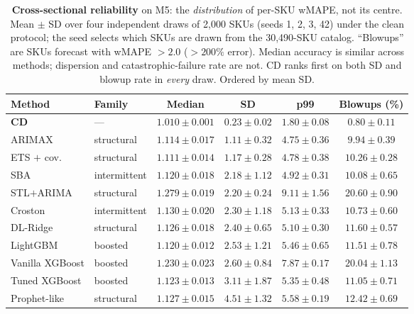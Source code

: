 \documentclass[10pt]{article} %
\theoremstyle{plain}
\theoremstyle{definition}
\begin{document}
\begin{table}[t]
\centering
\footnotesize
\setlength{\tabcolsep}{4pt}
\caption{\textbf{Cross-sectional reliability} on M5: the \emph{distribution} of per-SKU wMAPE, not its centre. Mean $\pm$ SD over four independent draws of 2{,}000 SKUs (seeds 1, 2, 3, 42) under the clean protocol; the seed selects which SKUs are drawn from the 30{,}490-SKU catalog. ``Blowups'' are SKUs forecast with wMAPE $>2.0$ ($>200\%$ error). Median accuracy is similar across methods; dispersion and catastrophic-failure rate are not. CD ranks first on both SD and blowup rate in \emph{every} draw. Ordered by mean SD.}
\label{tab:reliability}
\begin{tabular}{@{}llcccc@{}}
\toprule
Method & Family & Median & SD & p99 & Blowups (\%) \\
\midrule
\textbf{CD} & --- & $\mathbf{1.010 \pm 0.001}$ & $\mathbf{0.23 \pm 0.02}$ & $\mathbf{1.80 \pm 0.08}$ & $\mathbf{0.80 \pm 0.11}$ \\
\cmidrule(lr){1-6}
ARIMAX & structural & $1.114 \pm 0.017$ & $1.11 \pm 0.32$ & $4.75 \pm 0.36$ & $9.94 \pm 0.39$ \\
ETS $+$ cov. & structural & $1.111 \pm 0.014$ & $1.17 \pm 0.28$ & $4.78 \pm 0.38$ & $10.26 \pm 0.28$ \\
SBA & intermittent & $1.120 \pm 0.018$ & $2.18 \pm 1.12$ & $4.92 \pm 0.31$ & $10.08 \pm 0.65$ \\
STL$+$ARIMA & structural & $1.279 \pm 0.019$ & $2.20 \pm 0.24$ & $9.11 \pm 1.56$ & $20.60 \pm 0.90$ \\
Croston & intermittent & $1.130 \pm 0.020$ & $2.30 \pm 1.18$ & $5.13 \pm 0.33$ & $10.73 \pm 0.60$ \\
DL-Ridge & structural & $1.126 \pm 0.018$ & $2.40 \pm 0.65$ & $5.10 \pm 0.30$ & $11.60 \pm 0.57$ \\
LightGBM & boosted & $1.120 \pm 0.012$ & $2.53 \pm 1.21$ & $5.46 \pm 0.65$ & $11.51 \pm 0.78$ \\
Vanilla XGBoost & boosted & $1.230 \pm 0.023$ & $2.60 \pm 0.84$ & $7.87 \pm 0.17$ & $20.04 \pm 1.13$ \\
Tuned XGBoost & boosted & $1.123 \pm 0.013$ & $3.11 \pm 1.87$ & $5.35 \pm 0.48$ & $11.05 \pm 0.71$ \\
Prophet-like & structural & $1.127 \pm 0.015$ & $4.51 \pm 1.32$ & $5.58 \pm 0.19$ & $12.42 \pm 0.69$ \\
\bottomrule
\end{tabular}
\end{table}
\end{document}

